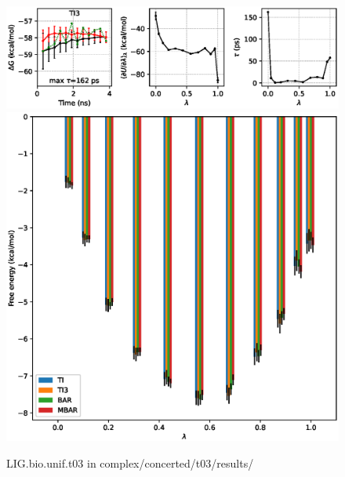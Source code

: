 \documentclass[journal=jctcce,manuscript=article,hyperref=false]{achemso}
\begin{document}
\clearpage
\pagebreak
\begin{figure}
\includegraphics[clip,width=6in]{complex.concerted.t03.results..GvsT.eps}\vspace{-0.3cm}
\includegraphics[clip,width=6in]{complex.concerted.t03.results..GvsL.eps}\vspace{-0.3cm}
\caption{LIG.bio.unif.t03 in complex/concerted/t03/results/}
\end{figure}
\end{document}
